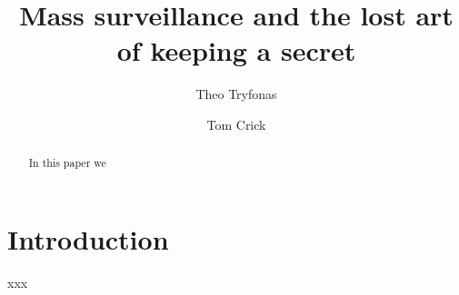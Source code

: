 \documentclass{llncs}
\begin{document}
\title{Mass surveillance and the lost art of keeping a secret}

\author{Theo Tryfonas \and Tom Crick}

\maketitle

\begin{abstract}
In this paper we 
\end{abstract}

\section{Introduction}
\label{sec:Introduction}
xxx
\end{document}
